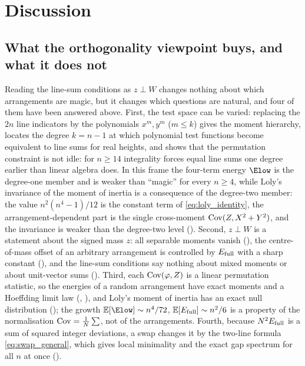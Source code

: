 \section{Discussion}
\label{sec:discussion}

\subsection{What the orthogonality viewpoint buys, and what it does not}

Reading the line-sum conditions as $z\perp W$ changes nothing about which arrangements are magic, but it changes which questions are natural, and four of them have been answered above.
First, the test space can be varied: replacing the $2n$ line indicators by the polynomials $x^m,y^m$ ($m\le k$) gives the moment hierarchy,  locates the degree $k=n-1$ at which polynomial test functions become equivalent to line sums for real heights, and  shows that the permutation constraint is not idle: for $n\ge14$ integrality forces equal line sums one degree earlier than linear algebra does.
In this frame the four-term energy $\Elow$ is the degree-one member and is weaker than ``magic'' for every $n\ge4$, while Loly's invariance of the moment of inertia \cite{loly2004invariance} is a consequence of the degree-two member: the value $n^2(n^4-1)/12$ is the constant term of \eqref{eq:loly_identity}, the arrangement-dependent part is the single cross-moment $\mathrm{Cov}(Z,X^2+Y^2)$, and the invariance is weaker than the degree-two level ().
Second, $z\perp W$ is a statement about the signed mass $z$: all separable moments vanish (), the centre-of-mass offset of an arbitrary arrangement is controlled by $E_{\mathrm{full}}$ with a sharp constant (), and the line-sum conditions say nothing about mixed moments or about unit-vector sums ().
Third, each $\mathrm{Cov}(\varphi,Z)$ is a linear permutation statistic, so the energies of a random arrangement have exact moments and a Hoeffding limit law (, ), and Loly's moment of inertia has an exact null distribution (); the growth $\E[\Elow]\sim n^4/72$, $\mathbb{E}[E_{\mathrm{full}}]\sim n^2/6$ is a property of the normalisation $\mathrm{Cov}=\frac1N\sum$, not of the arrangements.
Fourth, because $N^2E_{\mathrm{full}}$ is a sum of squared integer deviations, a swap changes it by the two-line formula \eqref{eq:swap_general}, which gives local minimality and the exact gap spectrum for all $n$ at once ().

